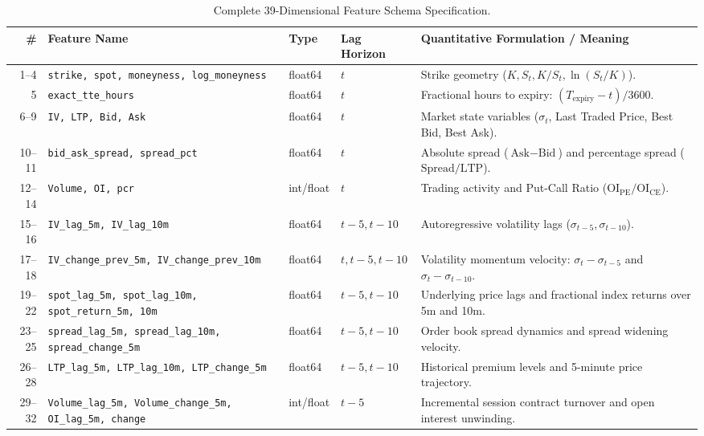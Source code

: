 \begin{table}[H]
    \centering
    \scriptsize
    \renewcommand{\arraystretch}{0.75}
    \caption{Complete 39-Dimensional Feature Schema Specification.}
    \label{tab:complete_feature_schema}
    \begin{tabularx}{\textwidth}{rllp{2.0cm}X}
        \toprule
        \textbf{\#} & \textbf{Feature Name} & \textbf{Type} & \textbf{Lag Horizon} & \textbf{Quantitative Formulation / Meaning} \\
        \midrule
        1--4 & \texttt{strike, spot, moneyness, log\_moneyness} & float64 & $t$ & Strike geometry ($K, S_t, K/S_t, \ln(S_t/K)$). \\
        5 & \texttt{exact\_tte\_hours} & float64 & $t$ & Fractional hours to expiry: $(T_{\text{expiry}} - t) / 3600$. \\
        6--9 & \texttt{IV, LTP, Bid, Ask} & float64 & $t$ & Market state variables ($\sigma_t$, Last Traded Price, Best Bid, Best Ask). \\
        10--11 & \texttt{bid\_ask\_spread, spread\_pct} & float64 & $t$ & Absolute spread ($\text{Ask}-\text{Bid}$) and percentage spread ($\text{Spread}/\text{LTP}$). \\
        12--14 & \texttt{Volume, OI, pcr} & int/float & $t$ & Trading activity and Put-Call Ratio ($\text{OI}_{\text{PE}} / \text{OI}_{\text{CE}}$). \\
        15--16 & \texttt{IV\_lag\_5m, IV\_lag\_10m} & float64 & $t-5, t-10$ & Autoregressive volatility lags ($\sigma_{t-5}, \sigma_{t-10}$). \\
        17--18 & \texttt{IV\_change\_prev\_5m, IV\_change\_prev\_10m} & float64 & $t, t-5, t-10$ & Volatility momentum velocity: $\sigma_t - \sigma_{t-5}$ and $\sigma_t - \sigma_{t-10}$. \\
        19--22 & \texttt{spot\_lag\_5m, spot\_lag\_10m, spot\_return\_5m, 10m} & float64 & $t-5, t-10$ & Underlying price lags and fractional index returns over 5m and 10m. \\
        23--25 & \texttt{spread\_lag\_5m, spread\_lag\_10m, spread\_change\_5m} & float64 & $t-5, t-10$ & Order book spread dynamics and spread widening velocity. \\
        26--28 & \texttt{LTP\_lag\_5m, LTP\_lag\_10m, LTP\_change\_5m} & float64 & $t-5, t-10$ & Historical premium levels and 5-minute price trajectory. \\
        29--32 & \texttt{Volume\_lag\_5m, Volume\_change\_5m, OI\_lag\_5m, change} & int/float & $t-5$ & Incremental session contract turnover and open interest unwinding. \\

\end{tabularx}
\end{table}
